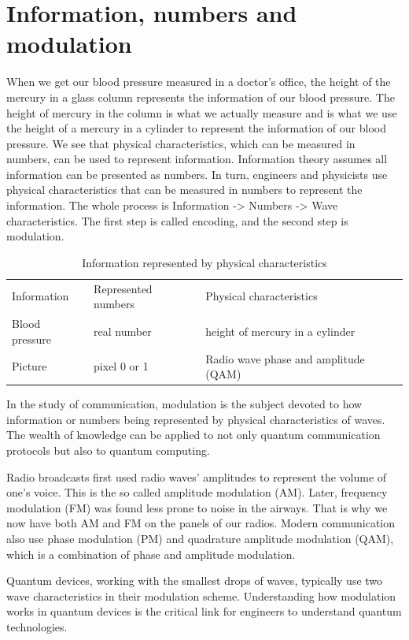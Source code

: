 \documentclass{book}
\begin{document}
\section{Information, numbers and modulation}
When we get our blood pressure measured in a doctor's office, the height of the mercury in a glass column represents 
the information of our blood pressure. The height of mercury in the column is what we actually measure and is 
what we use the height of a mercury in a cylinder to represent the information of our blood pressure. We see that physical characteristics, which can be measured in numbers, can be used to represent information. Information theory assumes all information can be presented as numbers. In turn, engineers and physicists use physical characteristics that can be measured in numbers to represent the information. The whole process is
Information -> Numbers -> Wave characteristics. The first step is called encoding, and the second step is modulation.
\begin{table}[]
\caption{Information represented by physical characteristics}
\label{information-characteristics}
\begin{tabular}{lll}
Information &Represented numbers & Physical characteristics  \\
Blood pressure & real number & height of mercury in a cylinder \\
Picture & pixel 0 or 1 & Radio wave phase and amplitude (QAM)
\end{tabular}
\end{table}


In the study of communication, modulation is the subject devoted to how information or numbers being represented by physical characteristics of waves. The wealth of knowledge can be applied to not only quantum communication protocols but also to quantum computing.

Radio broadcasts first used radio waves' amplitudes to represent the volume of one's voice. This is the so called amplitude modulation (AM). Later, frequency modulation (FM) was found less prone to noise in the airways. That is why we now have both AM and FM on the panels of our radios. Modern communication also use phase modulation (PM) and quadrature amplitude modulation (QAM), which is a combination of phase and amplitude modulation.

Quantum devices, working with the smallest drops of waves, typically use two wave characteristics in their modulation scheme. Understanding how modulation works in quantum devices is the critical link for engineers to understand quantum technologies.
\end{document}
